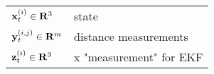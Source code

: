 \documentclass{article}
\begin{document}
\begin{table}[ht]
    \centering
    \begin{tabularx}{\linewidth}{lX}
        $\mathbf{x}_t^{(i)} \in \mathbf{R}^{3}$ & state\\
        $\mathbf{y}_t^{(i, j)} \in \mathbf{R}^{m}$ & distance measurements\\
        $\mathbf{z}_t^{(i)} \in \mathbf{R}^{3}$ & x "measurement" for EKF
    \end{tabularx}
\end{table}
\end{document}
